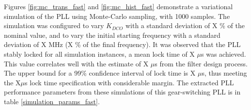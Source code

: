 		\FloatBarrier
		Figures \ref{fig:mc_trans_fast} and \ref{fig:mc_hist_fast} demonstrate a variational simulation of the PLL using Monte-Carlo sampling, with 1000 samples. The simulation was configured to vary $K_{DCO}$ with a standard deviation of X \% of the nominal value, and to vary the initial starting frequency with a standard deviation of X MHz (X \% of the final frequency). It was observed that the PLL stably locked for all simulation instances, a mean lock time of X $\mu$s was achieved. This value correlates well with the estimate of X $\mu$s from the filter design process. The upper bound for a 99\% confidence interval of lock time is X $\mu$s, thus meeting the X$\mu$s lock time specification with considerable margin. The extracted PLL performance parameters from these simulations of this gear-switching PLL is in table \ref{simulation_params_fast}. 

